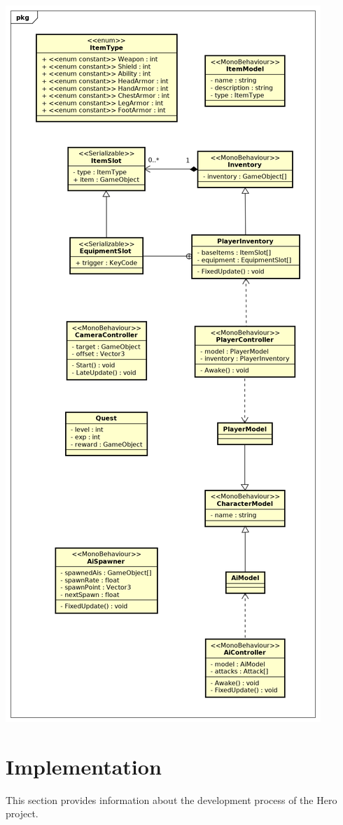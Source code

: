 \documentclass[11pt]{article}
\begin{document}
\begin{center}
 \includegraphics[height=\textheight]{./data.png}
\end{center}

\section{Implementation}
This section provides information about the development process of the Hero project.
\end{document}
